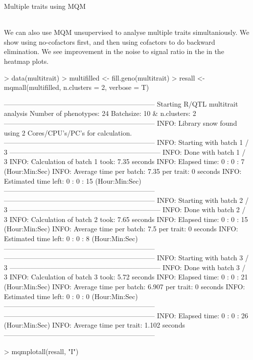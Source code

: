\documentclass[a4paper]{article}
\begin{document}
\begin{Large} Multiple traits using MQM \end{Large}\\
We can also use MQM unsupervised to analyse multiple traits simultaniously. We show using no-cofactors first, and then using cofactors to do backward elimination. We see improvement in the noise to signal ratio in the in the heatmap plots.
\begin{Schunk}
\begin{Sinput}
> data(multitrait)
> multifilled <- fill.geno(multitrait)
> resall <- mqmall(multifilled, n.clusters = 2, verbose = T)
\end{Sinput}
\begin{Soutput}
------------------------------------------------------------------
Starting R/QTL multitrait analysis
Number of phenotypes: 24 
Batchsize: 10  & n.clusters: 2 
------------------------------------------------------------------
INFO: Library snow found using  2  Cores/CPU's/PC's for calculation.
------------------------------------------------------------------
INFO: Starting with batch 1 / 3 
------------------------------------------------------------------
INFO: Done with batch 1 / 3 
INFO: Calculation of batch 1 took: 7.35 seconds
INFO: Elapsed time: 0 : 0 : 7 (Hour:Min:Sec)
INFO: Average time per batch: 7.35  per trait: 0 seconds
INFO: Estimated time left: 0 : 0 : 15 (Hour:Min:Sec)
------------------------------------------------------------------
------------------------------------------------------------------
INFO: Starting with batch 2 / 3 
------------------------------------------------------------------
INFO: Done with batch 2 / 3 
INFO: Calculation of batch 2 took: 7.65 seconds
INFO: Elapsed time: 0 : 0 : 15 (Hour:Min:Sec)
INFO: Average time per batch: 7.5  per trait: 0 seconds
INFO: Estimated time left: 0 : 0 : 8 (Hour:Min:Sec)
------------------------------------------------------------------
------------------------------------------------------------------
INFO: Starting with batch 3 / 3 
------------------------------------------------------------------
INFO: Done with batch 3 / 3 
INFO: Calculation of batch 3 took: 5.72 seconds
INFO: Elapsed time: 0 : 0 : 21 (Hour:Min:Sec)
INFO: Average time per batch: 6.907  per trait: 0 seconds
INFO: Estimated time left: 0 : 0 : 0 (Hour:Min:Sec)
------------------------------------------------------------------
------------------------------------------------------------------
INFO: Elapsed time: 0 : 0 : 26 (Hour:Min:Sec)
INFO: Average time per trait: 1.102 seconds
------------------------------------------------------------------
\end{Soutput}
\begin{Sinput}
> mqmplotall(resall, "I")
\end{Sinput}
\end{Schunk}
\end{document}
